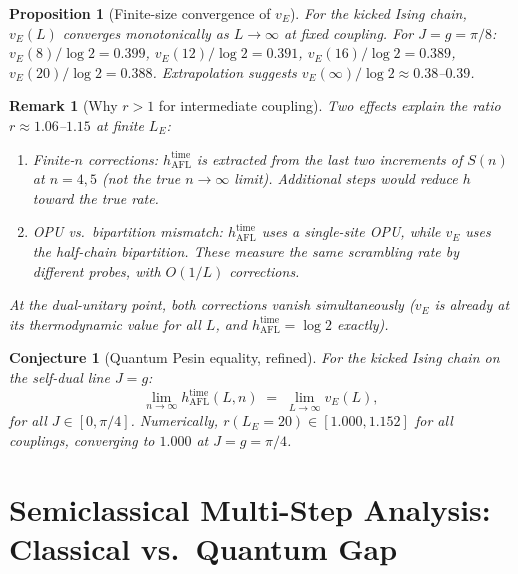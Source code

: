 \documentclass[12pt,a4paper]{article}
\newtheorem{proposition}[theorem]{Proposition}
\newtheorem{remark}[theorem]{Remark}
\newtheorem{conjecture}[theorem]{Conjecture}
\begin{document}
\begin{proposition}[Finite-size convergence of $v_E$]
  \label{prop:vE_convergence}
  For the kicked Ising chain, $v_E(L)$ converges monotonically as $L \to \infty$
  at fixed coupling.  For $J{=}g{=}\pi/8$: $v_E(8)/\log 2 = 0.399$,
  $v_E(12)/\log 2 = 0.391$, $v_E(16)/\log 2 = 0.389$, $v_E(20)/\log 2 = 0.388$.
  Extrapolation suggests $v_E(\infty)/\log 2 \approx 0.38$--$0.39$.
\end{proposition}

\begin{remark}[Why $r > 1$ for intermediate coupling]
  Two effects explain the ratio $r \approx 1.06$--$1.15$ at finite $L_E$:
  \begin{enumerate}
    \item \emph{Finite-$n$ corrections}: $h_{\mathrm{AFL}}^{\mathrm{time}}$
      is extracted from the last two increments of $S(n)$ at $n=4,5$
      (not the true $n \to \infty$ limit).  Additional steps would
      reduce $h$ toward the true rate.
    \item \emph{OPU vs.\ bipartition mismatch}: $h_{\mathrm{AFL}}^{\mathrm{time}}$
      uses a single-site OPU, while $v_E$ uses the half-chain bipartition.
      These measure the same scrambling rate by different probes, with
      $O(1/L)$ corrections.
  \end{enumerate}
  At the dual-unitary point, both corrections vanish simultaneously
  ($v_E$ is already at its thermodynamic value for all $L$, and
  $h_{\mathrm{AFL}}^{\mathrm{time}} = \log 2$ exactly).
\end{remark}

\begin{conjecture}[Quantum Pesin equality, refined]
  \label{conj:qp_equality_refined}
  For the kicked Ising chain on the self-dual line $J=g$:
  \[
    \lim_{n \to \infty} h_{\mathrm{AFL}}^{\mathrm{time}}(L,n)
    \;=\; \lim_{L \to \infty} v_E(L),
  \]
  for all $J \in [0,\pi/4]$.  Numerically, $r(L_E = 20) \in [1.000, 1.152]$
  for all couplings, converging to $1.000$ at $J{=}g{=}\pi/4$.
\end{conjecture}

\section{Semiclassical Multi-Step Analysis: Classical vs.\ Quantum Gap}
\label{sec:multistep}
\end{document}
